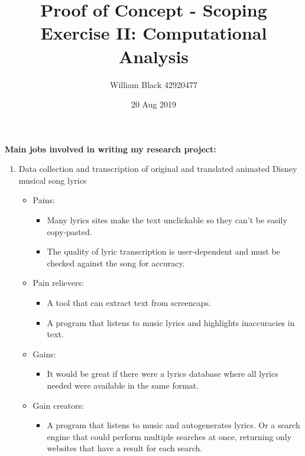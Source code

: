 \documentclass[12pt]{article}
\title{\textbf{Proof of Concept - Scoping Exercise II: \newline Computational Analysis}}
\date{20 Aug 2019}
\author{William Black 42920477}
\begin{document}
 
\maketitle \textbf{\large{Main jobs involved in writing my research project:}}
\begin{enumerate}

    \item Data collection and transcription of original and translated animated Disney musical song lyrics
    \begin{itemize}
        \renewcommand{\labelitemi}{$\clock$}
        \renewcommand{\labelitemii}{$\cdot$}
        \item Pains:
        \begin{itemize}
            \item Many lyrics sites make the text unclickable so they can't be easily copy-pasted. 
            \item The quality of lyric transcription is user-dependent and must be checked against the song for accuracy.
        \end{itemize}
        \renewcommand{\labelitemi}{$\sun$}
        \item Pain relievers:
        \begin{itemize}
            \item A tool that can extract text from screencaps.
            \item A program that listens to music lyrics and highlights inaccuracies in text. 
        \end{itemize}
        \renewcommand{\labelitemi}{$\smiley$}    
        \item Gains:
        \begin{itemize}
            \item It would be great if there were a lyrics database where all lyrics needed were available in the same format.
        \end{itemize}
        \renewcommand{\labelitemi}{$\blacksmiley$}
        \item Gain creators:
        \begin{itemize}
            \item A program that listens to music and autogenerates lyrics. Or a search engine that could perform multiple searches at once, returning only websites that have a result for each search.
        \end{itemize}
    \end{itemize}
    

\end{enumerate}
\end{document}
